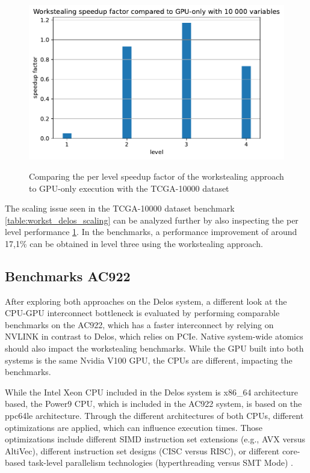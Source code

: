 \begin{figure}[H]
  \caption{Comparing the per level speedup factor of the workstealing approach to GPU-only execution with the TCGA-10000 dataset}
  \includegraphics[width=\textwidth]{figures/levelwise_scaled.pdf}
  \centering
  \label{fig:levelwise_scaled_delos}
\end{figure}


The scaling issue seen in the TCGA-10000 dataset benchmark \ref{table:workst_delos_scaling} can be analyzed further by also inspecting the per level performance \ref{fig:levelwise_scaled_delos}. In the benchmarks, a performance improvement of around 17,1\% can be obtained in level three using the workstealing approach.

\subsection{Benchmarks AC922}
After exploring both approaches on the Delos system, a different look at the CPU-GPU interconnect bottleneck is evaluated by performing comparable benchmarks on the AC922, which has a faster interconnect by relying on NVLINK in contrast to Delos, which relies on PCIe. Native system-wide atomics should also impact the workstealing benchmarks.
While the GPU built into both systems is the same Nvidia V100 GPU, the CPUs are different, impacting the benchmarks.

While the Intel Xeon CPU included in the Delos system is x86\_64 architecture based, the Power9 CPU, which is included in the AC922 system, is based on the ppc64le architecture. Through the different architectures of both CPUs, different optimizations are applied, which can influence execution times. Those optimizations include different SIMD instruction set extensions (e.g., AVX versus AltiVec), different instruction set designs (CISC versus RISC), or different core-based task-level parallelism technologies (hyperthreading versus SMT Mode) \cite{AnalysisX86Vs}.


